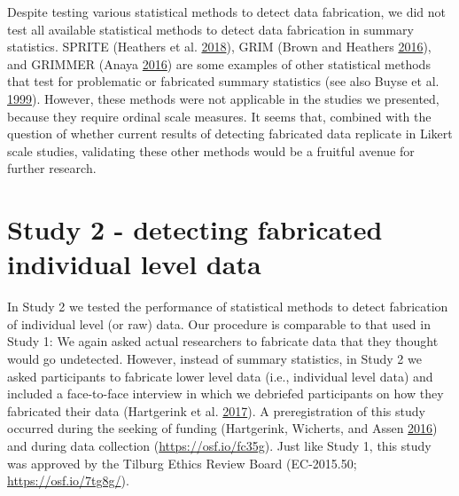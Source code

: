 \documentclass[a5paper]{book}
\begin{document}
Despite testing various statistical methods to detect data fabrication,
we did not test all available statistical methods to detect data
fabrication in summary statistics. SPRITE (Heathers et al.
\protect\hyperlink{ref-doi:10.7287ux2fpeerj.preprints.26968v1}{2018}),
GRIM (Brown and Heathers
\protect\hyperlink{ref-doi:10.1177ux2f1948550616673876}{2016}), and
GRIMMER (Anaya
\protect\hyperlink{ref-doi:10.7287ux2fpeerj.preprints.2400v1}{2016}) are
some examples of other statistical methods that test for problematic or
fabricated summary statistics (see also Buyse et al.
\protect\hyperlink{ref-buyse1999}{1999}). However, these methods were
not applicable in the studies we presented, because they require ordinal
scale measures. It seems that, combined with the question of whether
current results of detecting fabricated data replicate in Likert scale
studies, validating these other methods would be a fruitful avenue for
further research.

\section{Study 2 - detecting fabricated individual level
data}\label{study-2---detecting-fabricated-individual-level-data}

In Study 2 we tested the performance of statistical methods to detect
fabrication of individual level (or raw) data. Our procedure is
comparable to that used in Study 1: We again asked actual researchers to
fabricate data that they thought would go undetected. However, instead
of summary statistics, in Study 2 we asked participants to fabricate
lower level data (i.e., individual level data) and included a
face-to-face interview in which we debriefed participants on how they
fabricated their data (Hartgerink et al.
\protect\hyperlink{ref-doi:10.5281ux2fzenodo.832490}{2017}). A
preregistration of this study occurred during the seeking of funding
(Hartgerink, Wicherts, and Assen
\protect\hyperlink{ref-doi:10.3897ux2frio.2.e8860}{2016}) and during
data collection (\url{https://osf.io/fc35g}). Just like Study 1, this
study was approved by the Tilburg Ethics Review Board (EC-2015.50;
\url{https://osf.io/7tg8g/}).
\end{document}
